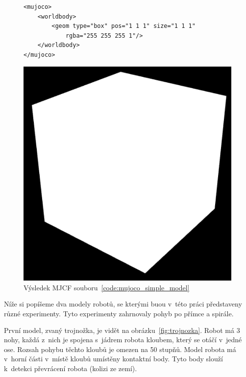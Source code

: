 \begin{figure}[h]
    \begin{minipage}[c]{0.68\linewidth}
        \begin{lstlisting}
<mujoco>
    <worldbody>
        <geom type="box" pos="1 1 1" size="1 1 1"
            rgba="255 255 255 1"/>
    </worldbody>
</mujoco>
        \end{lstlisting}
    \end{minipage}
    \hfill
    \begin{minipage}[c]{0.30\linewidth}
        \includegraphics[width=\linewidth]{obrazky/mujoco_simple_model.png}
        \caption{
            Výsledek MJCF souboru~\ref{code:mujoco_simple_model}
        }
        \label{fig:mujoco_simple_model}
    \end{minipage}
\end{figure}






Níže si popíšeme dva modely robotů, se kterými buou v~této práci představeny různé experimenty.
Tyto experimenty zahrnovaly pohyb po přímce a spirále.


První model, zvaný trojnožka, je vidět na obrázku~\ref{fig:trojnozka}.
Robot má 3 nohy, každá z~nich je spojena s~jádrem robota kloubem, který se otáčí v~jedné ose.
Rozsah pohybu těchto kloubů je omezen na 50 stupňů.
Model robota má v~horní části v~místě kloubů umístěny kontaktní body.
Tyto body slouží k~detekci převrácení robota (kolizi ze zemí).

